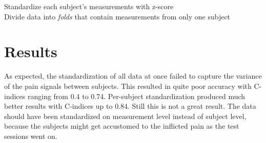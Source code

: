 \documentclass[a4paper]{article}
\begin{document}
\begin{algorithm}[H]
 
 \vspace*{0,5cm}

 Standardize each subject's measurements with z-score\\
 Divide data into \emph{folds} that contain measurements from only one subject\\
 \BlankLine
 
\end{algorithm}

\section{Results}

As expected, the standardization of all data at once failed to capture the variance of the pain signals between subjects. This resulted in quite poor accuracy with C-indices ranging from 0.4 to 0.74. Per-subject standardization produced much better results with C-indices up to 0.84. Still this is not a great result. The data should have been standardized on measurement level instead of subject level, because the subjects might get accustomed to the inflicted pain as the test sessions went on.\\
\end{document}
